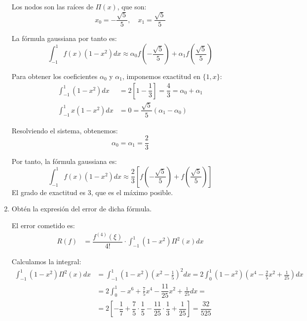 \begin{ejercicio}
\begin{enumerate}
        Los nodos son las raíces de $\Pi(x)$, que son:
        \begin{equation*}
            x_0 = -\dfrac{\sqrt{5}}{5}, \quad x_1 = \dfrac{\sqrt{5}}{5}
        \end{equation*}

        La fórmula gaussiana por tanto es:
        \begin{equation*}
            \int_{-1}^{1} f(x)(1 - x^2)dx \approx \alpha_0 f\left(-\dfrac{\sqrt{5}}{5}\right) + \alpha_1 f\left(\dfrac{\sqrt{5}}{5}\right)
        \end{equation*}

        Para obtener los coeficientes $\alpha_0$ y $\alpha_1$, imponemos exactitud en $\{1, x\}$:
        \begin{align*}
            \int_{-1}^{1} (1 - x^2)dx &= 2\left[1 - \dfrac{1}{3}\right] = \dfrac{4}{3} = \alpha_0 + \alpha_1\\
            \int_{-1}^{1} x(1 - x^2)dx &= 0 = \dfrac{\sqrt{5}}{5}\left(\alpha_1 - \alpha_0\right)
        \end{align*}

        Resolviendo el sistema, obtenemos:
        \begin{equation*}
            \alpha_0 = \alpha_1 = \dfrac{2}{3}
        \end{equation*}

        Por tanto, la fórmula gaussiana es:
        \begin{equation*}
            \int_{-1}^{1} f(x)(1 - x^2)dx \approx \dfrac{2}{3}\left[f\left(-\dfrac{\sqrt{5}}{5}\right) + f\left(\dfrac{\sqrt{5}}{5}\right)\right]
        \end{equation*}
        El grado de exactitud es $3$, que es el máximo posible.
        \item Obtén la expresión del error de dicha fórmula.
        
        El error cometido es:
        \begin{align*}
            R(f) &= \dfrac{f^{(4)}(\xi)}{4!}\cdot \int_{-1}^{1} (1 - x^2)\Pi^2(x)dx
        \end{align*}

        Calculamos la integral:
        \begin{align*}
            \int_{-1}^{1} (1 - x^2)\Pi^2(x)dx &= \int_{-1}^{1} (1 - x^2)\left(x^2 - \frac{1}{5}\right)^2dx
            = 2\int_{0}^{1} (1 - x^2)\left(x^4 - \frac{2}{5}x^2 + \frac{1}{25}\right)dx\\
            &= 2\int_{0}^{1} -x^6 + \frac{7}{5}x^4 - \dfrac{11}{25}x^2 + \frac{1}{25}dx
            =\\&= 2\left[-\dfrac{1}{7} + \dfrac{7}{5}\cdot \dfrac{1}{5} - \dfrac{11}{25}\cdot \dfrac{1}{3} + \dfrac{1}{25}\right]
            = \dfrac{32}{525}
        \end{align*}


\end{enumerate}
\end{ejercicio}
